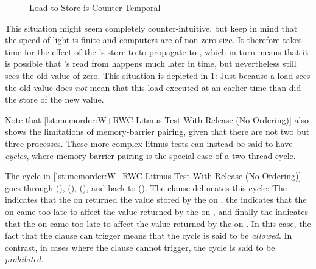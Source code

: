 \QuickQuizLabel{\MemorderQQLitmusTestR}

\begin{figure}
\centering
{}
\caption{Load-to-Store is Counter-Temporal}
\label{fig:memorder:Load-to-Store is Counter-Temporal}
\end{figure}

This situation might seem completely counter-intuitive, but keep
in mind that the speed of light is finite and computers are of
non-zero size.
It therefore takes time for the effect of the 's store to
 to propagate to , which in turn means that it is possible
that 's read from  happens much later in time, but
nevertheless still sees the old value of zero.
This situation is depicted in
\cref{fig:memorder:Load-to-Store is Counter-Temporal}:
Just because a load sees the old value does \emph{not} mean that
this load executed at an earlier time than did the store of the
new value.

Note that
\cref{lst:memorder:W+RWC Litmus Test With Release (No Ordering)}
also shows the limitations of memory-barrier pairing, given that
there are not two but three processes.
These more complex litmus tests can instead be said to have \emph{cycles},
where memory-barrier pairing is the special case of a two-thread cycle.
\begin{fcvref}
The cycle in
\cref{lst:memorder:W+RWC Litmus Test With Release (No Ordering)}
goes through  (),  (),
 (), and back to  ().
The  clause delineates this cycle:
The  indicates that the  on 
returned the value stored by the  on ,
the  indicates that the  on  came
too late to affect the value returned by the  on ,
and finally the  indicates that the
 on  came too late to affect the value returned
by the  on .
In this case, the fact that the  clause can trigger means that
the cycle is said to be \emph{allowed}.
In contrast, in cases where the  clause cannot trigger,
the cycle is said to be \emph{prohibited}.
\end{fcvref}

